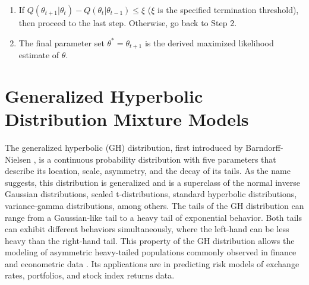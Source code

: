 \begin{enumerate}
    \item If \(Q(\theta_{t+1}|\theta_{t}) - Q(\theta_{t}|\theta_{t-1}) \le \xi \) (\(\xi \) is the specified termination threshold), then proceed to the last step. Otherwise, go back to Step 2.
    
    \item The final parameter set \(\theta^* = \theta_{t+1}\) is the derived maximized likelihood estimate of \(\theta\).
\end{enumerate}





\section{Generalized Hyperbolic Distribution Mixture Models}
\label{sec:ghd_ch3}
The generalized hyperbolic (GH) distribution, first introduced by Barndorff-Nielsen \cite{Barndorff1977}, is a continuous probability distribution with five parameters that describe its location, scale, asymmetry, and the decay of its tails. As the name suggests, this distribution is generalized and is a superclass of the normal inverse Gaussian distributions, scaled t-distributions, standard hyperbolic distributions, variance-gamma distributions, among others. The tails of the GH distribution can range from a Gaussian-like tail to a heavy tail of exponential behavior. Both tails can exhibit different behaviors simultaneously, where the left-hand can be less heavy than the right-hand tail. This property of the GH distribution allows the modeling of asymmetric heavy-tailed populations commonly observed in finance and econometric data \cite{Takahashi2016, Nwobi2014, Necula2009, Aas2006, Bibby2003}. Its applications are in predicting risk models of exchange rates, portfolios, and stock index returns data. 

